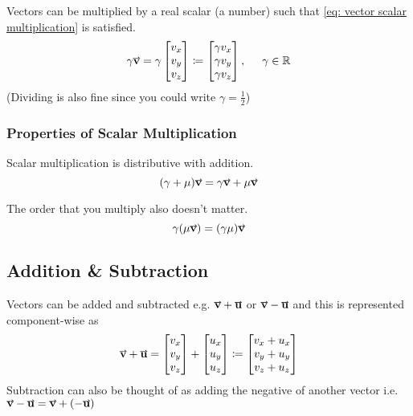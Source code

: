\documentclass[main.tex]{subfiles}
\begin{document}
                Vectors can be multiplied by a real scalar (a number) such that \eqref{eq: vector scalar multiplication} is satisfied.
                \begin{equation}
                    \gamma \vect{v} = \gamma \Matrix{v_x\\v_y\\v_z} \deq \Matrix{\gamma v_x\\ \gamma v_y\\ \gamma v_z}, \hspace{5mm} \gamma \in \Reals
                    \label{eq: vector scalar multiplication}
                \end{equation}
                (Dividing is also fine since you could write $\gamma = \frac{1}{2}$)

                \subsubsection{Properties of Scalar Multiplication}
                    \label{subsubsec: Properties of Scalar Multiplication}

                    Scalar multiplication is distributive with addition.
                    \begin{equation}
                        (\gamma + \mu)\vect{v} = \gamma \vect{v} + \mu \vect{v}
                    \end{equation}
                    

                    The order that you multiply also doesn't matter.
                    \begin{equation}
                        \gamma(\mu \vect{v}) = (\gamma \mu)\vect{v}
                    \end{equation}





            \subsection{Addition \& Subtraction}
                \label{subsec: Vector Addition and Subtraction}

                Vectors can be added and subtracted e.g. $\vect{v} + \vect{u}$ or $\vect{v} - \vect{u}$ and this is represented component-wise as 
                \begin{equation}
                    \vect{v} + \vect{u} = \Matrix{v_x\\v_y\\v_z} + \Matrix{u_x\\u_y\\u_z} \deq \Matrix{v_x + u_x\\v_y + u_y\\v_z + u_z}
                \end{equation}
                Subtraction can also be thought of as adding the negative of another vector i.e. $\vect{v} - \vect{u} = \vect{v} + (-\vect{u})$
                
\end{document}
